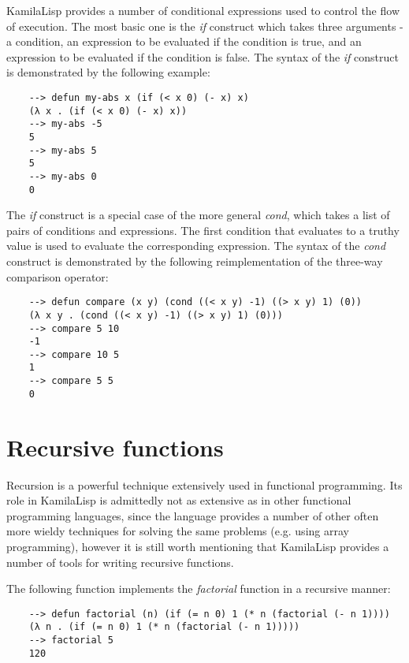 KamilaLisp provides a number of conditional expressions used to control the flow of execution. The most basic one is the \textit{if} construct which takes three arguments - a condition, an expression to be evaluated if the condition is true, and an expression to be evaluated if the condition is false. The syntax of the \textit{if} construct is demonstrated by the following example:

\begin{Verbatim}
    --> defun my-abs x (if (< x 0) (- x) x)
    (λ x . (if (< x 0) (- x) x))
    --> my-abs -5
    5
    --> my-abs 5
    5
    --> my-abs 0
    0
\end{Verbatim}

The \textit{if} construct is a special case of the more general \textit{cond}, which takes a list of pairs of conditions and expressions. The first condition that evaluates to a truthy value is used to evaluate the corresponding expression. The syntax of the \textit{cond} construct is demonstrated by the following reimplementation of the three-way comparison operator:

\begin{Verbatim}
    --> defun compare (x y) (cond ((< x y) -1) ((> x y) 1) (0))
    (λ x y . (cond ((< x y) -1) ((> x y) 1) (0)))
    --> compare 5 10
    -1
    --> compare 10 5
    1
    --> compare 5 5
    0
\end{Verbatim}

\section{Recursive functions}

Recursion is a powerful technique extensively used in functional programming. Its role in KamilaLisp is admittedly not as extensive as in other functional programming languages, since the language provides a number of other often more wieldy techniques for solving the same problems (e.g. using array programming), however it is still worth mentioning that KamilaLisp provides a number of tools for writing recursive functions.

The following function implements the \textit{factorial} function in a recursive manner:

\begin{Verbatim}
    --> defun factorial (n) (if (= n 0) 1 (* n (factorial (- n 1))))
    (λ n . (if (= n 0) 1 (* n (factorial (- n 1)))))
    --> factorial 5
    120
\end{Verbatim}


